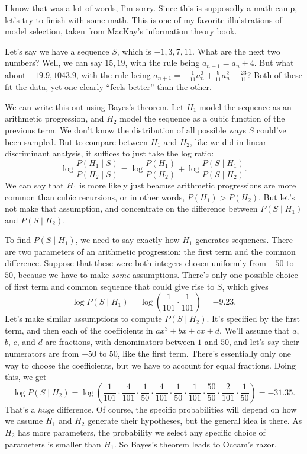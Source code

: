 \documentclass[11pt,paper=letter]{scrartcl}
\begin{document}
I know that was a lot of words, I'm sorry. Since this is supposedly a math camp, let's try to finish with some math. This is one of my favorite illulstrations of model selection, taken from MacKay's information theory book.

Let's say we have a sequence $S$, which is $-1, 3, 7, 11$. What are the next two numbers? Well, we can say $15, 19$, with the rule being $a_{n+1} = a_n + 4$. But what about $-19.9, 1043.9$, with the rule being $a_{n+1} = -\frac{1}{11}a_n^3 + \frac{9}{11}a_n^2 + \frac{23}{11}$? Both of these fit the data, yet one clearly ``feels better'' than the other.

We can write this out using Bayes's theorem. Let $H_1$ model the sequence as an arithmetic progression, and $H_2$ model the sequence as a cubic function of the previous term. We don't know the distribution of all possible ways $S$ could've been sampled. But to compare between $H_1$ and $H_2$, like we did in linear discriminant analysis, it suffices to just take the log ratio: \[
  \log \frac{P(H_1 \mid S)}{P(H_2 \mid S)}
  = \log \frac{P(H_1)}{P(H_2)} + \log \frac{P(S \mid H_1)}{P(S \mid H_2)}.
\]
We can say that $H_1$ is more likely just beacuse arithmetic progressions are more common than cubic recursions, or in other words, $P(H_1) > P(H_2)$. But let's not make that assumption, and concentrate on the difference between $P(S \mid H_1)$ and $P(S \mid H_2)$.

To find $P(S \mid H_1)$, we need to say exactly how $H_1$ generates sequences. There are two parameters of an arithmetic progression: the first term and the common difference. Suppose that these were both integers chosen uniformly from $-50$ to $50$, because we have to make \textit{some} assumptions. There's only one possible choice of first term and common sequence that could give rise to $S$, which gives
\[
  \log P(S \mid H_1) = \log \left(\frac{1}{101} \cdot \frac{1}{101}\right) = -9.23.
\]
Let's make similar assumptions to compute $P(S \mid H_2)$. It's specified by the first term, and then each of the coefficients in $ax^3 + bx + cx + d$. We'll assume that $a$, $b$, $c$, and $d$ are fractions, with denominators between $1$ and $50$, and let's say their numerators are from $-50$ to $50$, like the first term. There's essentially only one way to choose the coefficients, but we have to account for equal fractions. Doing this, we get
\[
  \log P(S \mid H_2) = \log \left(\frac{1}{101} \cdot \frac{4}{101} \cdot \frac{1}{50} \cdot \frac{4}{101} \cdot \frac{1}{50} \cdot \frac{1}{101} \cdot \frac{50}{50} \cdot \frac{2}{101} \cdot \frac{1}{50}\right)
  = -31.35.
\]
That's a \textit{huge} difference. Of course, the specific probabilities will depend on how we assume $H_1$ and $H_2$ generate their hypotheses, but the general idea is there. As $H_2$ has more parameters, the probability we select any specific choice of parameters is smaller than $H_1$. So Bayes's theorem leads to Occam's razor.
\end{document}
